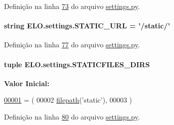 Definição na linha \hyperlink{settings_8py_source_l00073}{73} do arquivo \hyperlink{settings_8py_source}{settings.\-py}.

\hypertarget{namespaceELO_1_1settings_a408323f388e22737eedf90471a3809a4}{
\paragraph[{S\-T\-A\-T\-I\-C\-\_\-\-U\-R\-L}]{\setlength{\rightskip}{0pt plus 5cm}string E\-L\-O.\-settings.\-S\-T\-A\-T\-I\-C\-\_\-\-U\-R\-L = '/static/'}}\label{namespaceELO_1_1settings_a408323f388e22737eedf90471a3809a4}


Definição na linha \hyperlink{settings_8py_source_l00077}{77} do arquivo \hyperlink{settings_8py_source}{settings.\-py}.

\hypertarget{namespaceELO_1_1settings_aa2272e7a822b45c2101e4f5a958e22a6}{
\paragraph[{S\-T\-A\-T\-I\-C\-F\-I\-L\-E\-S\-\_\-\-D\-I\-R\-S}]{\setlength{\rightskip}{0pt plus 5cm}tuple E\-L\-O.\-settings.\-S\-T\-A\-T\-I\-C\-F\-I\-L\-E\-S\-\_\-\-D\-I\-R\-S}}\label{namespaceELO_1_1settings_aa2272e7a822b45c2101e4f5a958e22a6}
{\bfseries Valor Inicial\-:}
\begin{DoxyCode}
\hypertarget{namespaceELO_1_1settings_l00001}{}\hyperlink{namespaceELO_1_1settings}{00001} = (
00002     \hyperlink{namespaceELO_1_1settings_a7730264ddd478343e0f282f36d4a5ab4}{filepath}(\textcolor{stringliteral}{'static'}),
00003 )
\end{DoxyCode}


Definição na linha \hyperlink{settings_8py_source_l00080}{80} do arquivo \hyperlink{settings_8py_source}{settings.\-py}.

